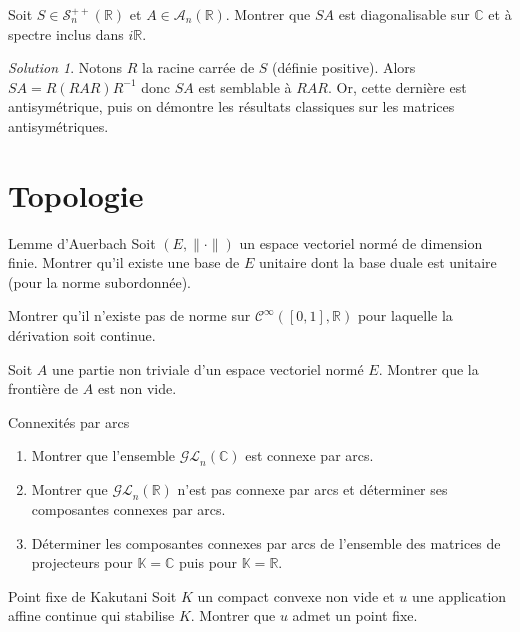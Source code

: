 \documentclass[french]{book}
\newcommand{\R}{\mathbb{R}}
\newcommand{\C}{\mathbb{C}}
\newcommand{\K}{\mathbb{K}}
\newcommand{\inv}{^{-1}}
\theoremstyle{definition}
\theoremstyle{remark}
\newtheorem*{sol}{Solution}
\begin{document}
\begin{exo}[3]{}
	Soit $S\in\mathcal{S}_n^{++}(\R)$ et $A\in\mathcal{A}_n(\R)$. Montrer que $SA$ est diagonalisable sur $\C$ et à spectre inclus dans $i\R$.
\end{exo}
\begin{sol}
	Notons $R$ la racine carrée de $S$ (définie positive). Alors $SA=R(RAR)R\inv$ donc $SA$ est semblable à $RAR$. Or, cette dernière est antisymétrique, puis on démontre les résultats classiques sur les matrices antisymétriques.
\end{sol}


\chapter{Topologie}

\begin{exo}[1]{Lemme d'Auerbach}
	Soit $(E,\lVert\cdot\rVert)$ un espace vectoriel normé de dimension finie. Montrer qu'il existe une base de $E$ unitaire dont la base duale est unitaire (pour la norme subordonnée).
\end{exo}

\begin{exo}[1]{}
	Montrer qu'il n'existe pas de norme sur $\mathcal{C}^{\infty}([0,1],\R)$ pour laquelle la dérivation soit continue.
\end{exo}

\begin{exo}[1]{}
	Soit $A$ une partie non triviale d'un espace vectoriel normé $E$. Montrer que la frontière de $A$ est non vide.
\end{exo}

\begin{exo}[2]{Connexités par arcs}
	\begin{enumerate}
		\item Montrer que l'ensemble $\mathcal{GL}_n(\C)$ est connexe par arcs.
		\item Montrer que $\mathcal{GL}_n(\R)$ n'est pas connexe par arcs et déterminer ses composantes connexes par arcs.
		\item Déterminer les composantes connexes par arcs de l'ensemble des matrices de projecteurs pour $\K=\C$ puis pour $\K=\R$.
	\end{enumerate}
\end{exo}

\begin{exo}[2]{Point fixe de Kakutani}
	Soit $K$ un compact convexe non vide et $u$ une application affine continue qui stabilise $K$. Montrer que $u$ admet un point fixe.
\end{exo}
\end{document}
